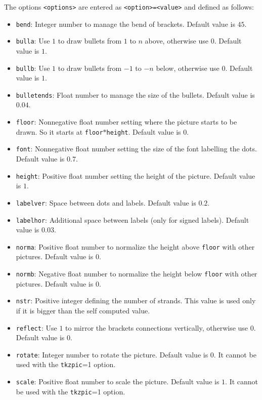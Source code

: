 \documentclass[reqno]{../../../Projects/LaTeX/gtpart}
\numberwithin{equation}{section}
\begin{document}
The options \texttt{<options>} are entered as \texttt{<option>=<value>} and defined as follows:
\begin{itemize}
\item \texttt{bend}: Integer number to manage the bend of brackets. Default value is $45$.
\item \texttt{bulla}: Use $1$ to draw bullets from $1$ to $n$ above, otherwise use $0$. Default value is $1$.
\item \texttt{bullb}: Use $1$ to draw bullets from $-1$ to $-n$ below, otherwise use $0$. Default value is $1$.
\item \texttt{bulletends}: Float number to manage the size of the bullets. Default value is $0.04$.
\item \texttt{floor}: Nonnegative float number setting where the picture starts to be drawn. So it starts at \texttt{floor}$*$\texttt{height}. Default value is $0$.
\item \texttt{font}: Nonnegative float number setting the size of the font labelling the dots. Default value is $0.7$.
\item \texttt{height}: Positive float number setting the height of the picture. Default value is $1$. 
\item \texttt{labelver}: Space between dots and labels. Default value is $0.2$.
\item \texttt{labelhor}: Additional space between labels (only for signed labels). Default value is $0.03$.
\item \texttt{norma}: Positive float number to normalize the height above \texttt{floor} with other pictures. Default value is $0$.
\item \texttt{normb}: Negative float number to normalize the height below \texttt{floor} with other pictures. Default value is $0$.
\item \texttt{nstr}: Positive integer defining the number of strands. This value is used only if it is bigger than the self computed value.
\item \texttt{reflect}: Use $1$ to mirror the brackets connections vertically, otherwise use $0$. Default value is $0$.  
\item \texttt{rotate}: Integer number to rotate the picture. Default value is $0$. It cannot be used with the \texttt{tkzpic}=1 option.
\item \texttt{scale}: Positive float number to scale the picture. Default value is $1$. It cannot be used with the \texttt{tkzpic}=1 option.

\end{itemize}
\end{document}
